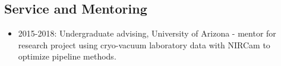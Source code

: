 \documentclass[11pt, oneside]{article}   	%
\begin{document}
\subsection*{Service and Mentoring}
\begin{itemize}[noitemsep]
    \item 2015-2018: Undergraduate advising, University of Arizona - mentor for research project using cryo-vacuum laboratory data with NIRCam to optimize pipeline methods.
\end{itemize}


\end{document}
